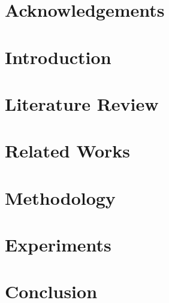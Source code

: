 \documentclass[11pt]{book}
\begin{document}

\doublespacing



\chapter*{Acknowledgements}



\tableofcontents{}
\listoffigures
\listoftables
\clearpage


% 

\chapter {Introduction}


\chapter {Literature Review}


\chapter {Related Works}
\label{literature}



\chapter{Methodology}
\label{sec:exp}


\chapter {Experiments}
\label{chapter:four}


\chapter{Conclusion}


\renewcommand{\bibname}{References}
	


\newpage
\newcommand{\beginsupplement}{%
    \setcounter{chapter}{0}
    \renewcommand{\thechapter}{\Alph{chapter}}%
 }
\end{document}
